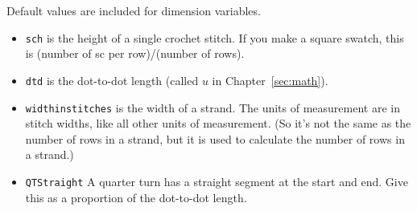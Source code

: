 \documentclass[openany]{book}
\begin{document}
Default values are included for dimension variables.
\begin{itemize}
\item \texttt{sch} is the height of a single crochet stitch. If you make a square swatch, this is (number of sc per row)/(number of rows).
\item \texttt{dtd} is the dot-to-dot length (called $u$ in Chapter~\ref{sec:math}).
\item \texttt{widthinstitches} is the width of a strand. The units of measurement are in stitch widths, like all other units of measurement. (So it's not the same as the number of rows in a strand, but it is used to calculate the number of rows in a strand.)
\item \texttt{QTStraight} A quarter turn has a straight segment at the start and end. Give this as a proportion of the dot-to-dot length.
\end{itemize}
\end{document}
